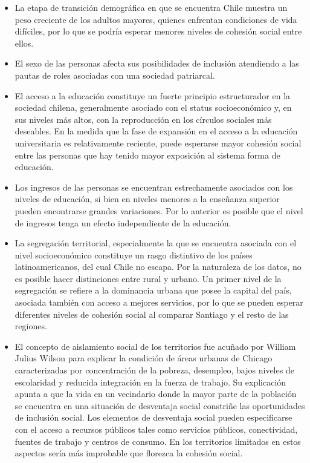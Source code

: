 \documentclass[
  12pt,
]{book}
\begin{document}
\begin{itemize}
\item
  La etapa de transición demográfica en que se encuentra Chile muestra un peso creciente de los adultos mayores, quienes enfrentan condiciones de vida difíciles, por lo que se podría esperar menores niveles de cohesión social entre ellos.
\item
  El sexo de las personas afecta sus posibilidades de inclusión atendiendo a las pautas de roles asociadas con una sociedad patriarcal.
\item
  El acceso a la educación constituye un fuerte principio estructurador en la sociedad chilena, generalmente asociado con el status socioeconómico y, en sus niveles más altos, con la reproducción en los círculos sociales más deseables. En la medida que la fase de expansión en el acceso a la educación universitaria es relativamente reciente, puede esperarse mayor cohesión social entre las personas que hay tenido mayor exposición al sistema forma de educación.
\item
  Los ingresos de las personas se encuentran estrechamente asociados con los niveles de educación, si bien en niveles menores a la enseñanza superior pueden encontrarse grandes variaciones. Por lo anterior es posible que el nivel de ingresos tenga un efecto independiente de la educación.
\item
  La segregación territorial, especialmente la que se encuentra asociada con el nivel socioeconómico constituye un rasgo distintivo de los países latinoamericanos, del cual Chile no escapa. Por la naturaleza de los datos, no es posible hacer distinciones entre rural y urbano. Un primer nivel de la segregación se refiere a la dominancia urbana que posee la capital del país, asociada también con acceso a mejores servicios, por lo que se pueden esperar diferentes niveles de cohesión social al comparar Santiago y el resto de las regiones.
\item
  El concepto de aislamiento social de los territorios fue acuñado por William Julius Wilson para explicar la condición de áreas urbanas de Chicago caracterizadas por concentración de la pobreza, desempleo, bajos niveles de escolaridad y reducida integración en la fuerza de trabajo. Su explicación apunta a que la vida en un vecindario donde la mayor parte de la población se encuentra en una situación de desventaja social constriñe las oportunidades de inclusión social. Los elementos de desventaja social pueden especificarse con el acceso a recursos públicos tales como servicios públicos, conectividad, fuentes de trabajo y centros de consumo. En los territorios limitados en estos aspectos sería más improbable que florezca la cohesión social.

\end{itemize}
\end{document}
